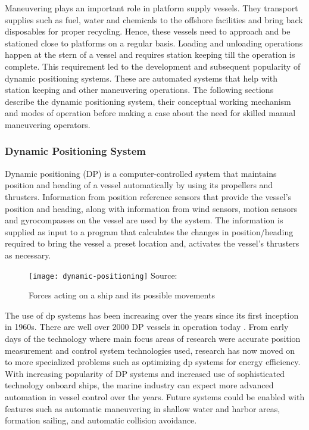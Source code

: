 Maneuvering plays an important role in platform supply vessels. They transport supplies such as fuel, water and chemicals to the offshore facilities and bring back disposables for proper recycling. Hence, these vessels need to approach and be stationed close to platforms on a regular basis. Loading and unloading operations happen at the stern of a vessel and requires station keeping till the operation is complete. This requirement led to the development and subsequent popularity of dynamic positioning systems. These are automated systems that help with station keeping and other maneuvering operations. The following sections describe the dynamic positioning system, their conceptual working mechanism and modes of operation before making a case about the need for skilled manual maneuvering operators.
 

\subsubsection{Dynamic Positioning System}

 Dynamic positioning (DP) is a computer-controlled system that maintains position and heading of a vessel automatically by using its propellers and thrusters. Information from position reference sensors that provide the vessel’s position and heading, along with information from wind sensors, motion sensors and gyrocompasses on the vessel are used by the system. The information is supplied as input to a program that calculates the changes in position/heading required to bring the vessel a preset location and, activates the vessel’s thrusters as necessary.

\begin{figure}
	\centering
	\caption{Forces acting on a ship and its possible movements}
	\texttt{[image: dynamic-positioning]}
	\hbox{\small Source: }
	\label{fig:shipforces}
\end{figure}


The use of dp systems has been increasing over the years since its first inception in 1960s. There are well over 2000 DP vessels in operation today \cite{sorensen2011survey}. From early days of the technology where main focus areas of research were accurate position measurement and control system technologies used, research has now moved on to more specialized problems such as optimizing dp systems for energy efficiency. With increasing popularity of DP systems and increased use of sophisticated technology onboard ships, the marine industry can expect more advanced automation in vessel control over the years. Future systems could be enabled with features such as automatic maneuvering in shallow water and harbor areas, formation sailing, and automatic collision avoidance.

